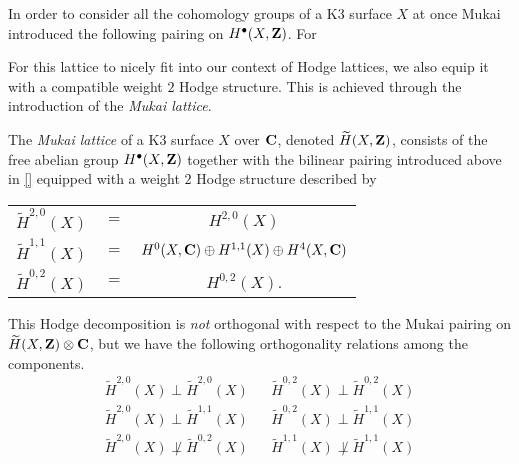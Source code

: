In order to consider all the cohomology groups of a K3 surface $X$ at once Mukai introduced the following pairing on $H^{\bullet}(X, \mathbf Z)$. For 

For this lattice to nicely fit into our context of Hodge lattices, we also equip it with a compatible weight $2$ Hodge structure. This is achieved through the introduction of the \emph{Mukai lattice}. 

\begin{definition}
    The \emph{Mukai lattice} of a K3 surface $X$ over $\mathbf C$, denoted $\widetilde{H}(X, \mathbf Z)$, consists of the free abelian group $H^{\bullet}(X, \mathbf Z)$ together with the bilinear pairing introduced above in \eqref{} equipped with a weight $2$ Hodge structure described by 
\end{definition}

\begin{center}
    \begin{tabular}{r c c}
        $\widetilde{H}^{2,0}(X)$ & $=$ & $H^{2,0}(X)$ \\
        $\widetilde{H}^{1,1}(X)$ & $=$ & $H^{0}(X, \mathbf C) \oplus H^{1,1}(X) \oplus H^{4}(X, \mathbf C)$ \\
        $\widetilde{H}^{0,2}(X)$ & $=$ & $H^{0,2}(X)$.
    \end{tabular}
\end{center}

\begin{remark}
    This Hodge decomposition is \emph{not} orthogonal with respect to the Mukai pairing on $\widetilde{H}(X, \mathbf Z) \otimes \mathbf C$, but we have the following orthogonality relations among the components. 
    \begin{align*}
        \widetilde{H}^{2,0}(X) \perp \widetilde{H}^{2,0}(X) & & \widetilde{H}^{0,2}(X) \perp \widetilde{H}^{0,2}(X) \\
        \widetilde{H}^{2,0}(X) \perp \widetilde{H}^{1,1}(X) & &\widetilde{H}^{0,2}(X) \perp \widetilde{H}^{1,1}(X) \\
        \widetilde{H}^{2,0}(X) \not\perp \widetilde{H}^{0,2}(X) & &\widetilde{H}^{1,1}(X) \not\perp \widetilde{H}^{1,1}(X)
    \end{align*}
\end{remark}

